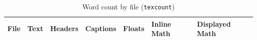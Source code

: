\begin{table}[h]

\centering

\begin{tabularx}{\textwidth}{r X r r X X X}
\textbf{File} & \textbf{Text} & \textbf{Headers} & \textbf{Captions} & \textbf{Floats} & \textbf{Inline Math} & \textbf{Displayed Math} \\
\hline
\end{tabularx}
\caption{Word count by file (\texttt{texcount})}
\end{table}
